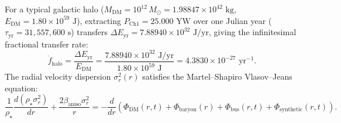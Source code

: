 \documentclass[11pt,onecolumn]{article}
\begin{document}
For a typical galactic halo ($M_{\text{DM}} = 10^{12}\,M_\odot = 1.98847 \times 10^{42}\text{ kg}$, $E_{\text{DM}} = 1.80 \times 10^{59}\text{ J}$), extracting $P_{\text{Ch1}} = 25.000\text{ YW}$ over one Julian year ($\tau_{\text{yr}} = 31{,}557{,}600\text{ s}$) transfers $\Delta E_{\text{yr}} = 7.88940 \times 10^{32}\text{ J/yr}$, giving the infinitesimal fractional transfer rate:
\begin{equation}
\dot{f}_{\text{halo}} = \frac{\Delta E_{\text{yr}}}{E_{\text{DM}}} = \frac{7.88940 \times 10^{32}\text{ J/yr}}{1.80 \times 10^{59}\text{ J}} = 4.3830 \times 10^{-27}\text{ yr}^{-1}.
\label{eq:v8_14}
\end{equation}
The radial velocity dispersion $\sigma_r^2(r)$ satisfies the Martel--Shapiro Vlasov--Jeans equation:
\begin{equation}
\frac{1}{\rho_\star}\frac{d(\rho_\star\sigma_r^2)}{dr} + \frac{2\beta_{\text{aniso}}\sigma_r^2}{r} = -\frac{d}{dr}\left(\Phi_{\text{DM}}(r,t) + \Phi_{\text{baryon}}(r) + \Phi_{\text{bus}}(r,t) + \Phi_{\text{synthetic}}(r,t)\right).
\label{eq:v8_15}
\end{equation}

\FloatBarrier
\begin{table}[!htbp]
\centering\small
\caption{Cosmic Epoch Stress-Energy and ADM Invariance under Dark-Completion Relaxation.}
\label{tab:v8_cosmic_epochs}
\end{table}
\FloatBarrier
\end{document}
